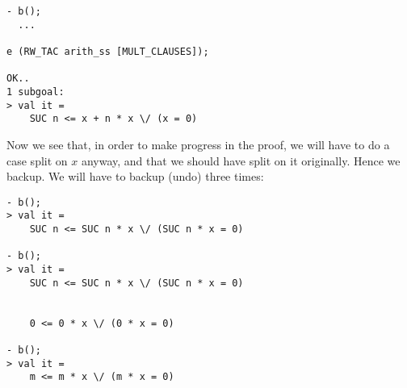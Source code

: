 \begin{session}
\begin{verbatim}
- b();
  ...

e (RW_TAC arith_ss [MULT_CLAUSES]);

OK..
1 subgoal:
> val it =
    SUC n <= x + n * x \/ (x = 0)
\end{verbatim}
\end{session}
Now we see that, in order to make progress in the proof, we will have to
do a case split on $x$ anyway, and that we should have split on it
originally. Hence we backup. We will have to backup (undo) three times:
\begin{session}
\begin{verbatim}
- b();
> val it =
    SUC n <= SUC n * x \/ (SUC n * x = 0)

- b();
> val it =
    SUC n <= SUC n * x \/ (SUC n * x = 0)


    0 <= 0 * x \/ (0 * x = 0)

- b();
> val it =
    m <= m * x \/ (m * x = 0)
\end{verbatim}
\end{session}

